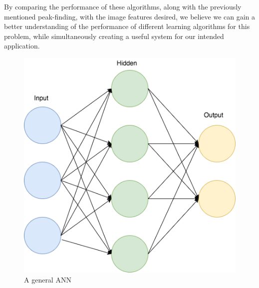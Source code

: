 By comparing the performance of these algorithms, along with the previously mentioned peak-finding, with the image features desired, we believe we can gain a better understanding of the performance of different learning algorithms for this problem, while simultaneously creating a useful system for our intended application.

\begin{figure}[h]
\centering
\includegraphics[scale=.50]{figures/NN}
\caption{A general ANN}
\label{fig:tamu-fig3}
\end{figure}



